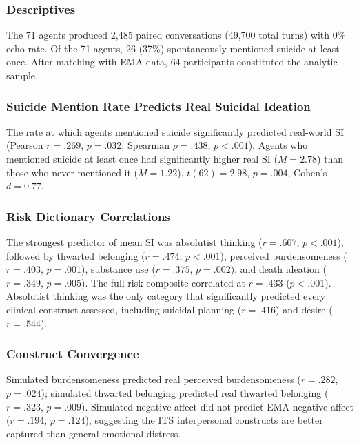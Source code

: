 \documentclass[review,12pt,authoryear]{elsarticle}
\begin{document}
\subsubsection{Descriptives}

The 71 agents produced 2,485 paired conversations (49,700 total turns) with 0\% echo rate. Of the 71 agents, 26 (37\%) spontaneously mentioned suicide at least once. After matching with EMA data, 64 participants constituted the analytic sample.

\subsubsection{Suicide Mention Rate Predicts Real Suicidal Ideation}

The rate at which agents mentioned suicide significantly predicted real-world SI (Pearson $r = .269$, $p = .032$; Spearman $\rho = .438$, $p < .001$). Agents who mentioned suicide at least once had significantly higher real SI ($M = 2.78$) than those who never mentioned it ($M = 1.22$), $t(62) = 2.98$, $p = .004$, Cohen's $d = 0.77$.

\subsubsection{Risk Dictionary Correlations}

The strongest predictor of mean SI was absolutist thinking ($r = .607$, $p < .001$), followed by thwarted belonging ($r = .474$, $p < .001$), perceived burdensomeness ($r = .403$, $p = .001$), substance use ($r = .375$, $p = .002$), and death ideation ($r = .349$, $p = .005$). The full risk composite correlated at $r = .433$ ($p < .001$). Absolutist thinking was the only category that significantly predicted every clinical construct assessed, including suicidal planning ($r = .416$) and desire ($r = .544$).

\subsubsection{Construct Convergence}

Simulated burdensomeness predicted real perceived burdensomeness ($r = .282$, $p = .024$); simulated thwarted belonging predicted real thwarted belonging ($r = .323$, $p = .009$). Simulated negative affect did not predict EMA negative affect ($r = .194$, $p = .124$), suggesting the ITS interpersonal constructs are better captured than general emotional distress.
\end{document}
